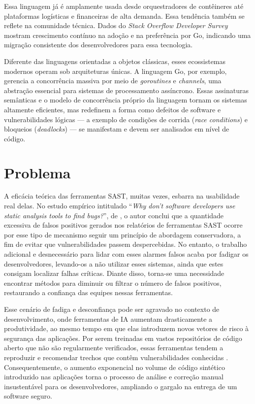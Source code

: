 Essa linguagem já é amplamente usada desde orquestradores de contêineres até plataformas logísticas e financeiras de alta demanda. Essa tendência também se reflete na comunidade técnica. Dados do \textit{Stack Overflow Developer Survey} \cite{stackoverflow2025} mostram crescimento contínuo na adoção e na preferência por Go, indicando uma migração consistente dos desenvolvedores para essa tecnologia.

Diferente das linguagens orientadas a objetos clássicas, esses ecossistemas modernos operam sob arquiteturas únicas. A linguagem Go, por exemplo, gerencia a concorrência massiva por meio de \textit{goroutines} e \textit{channels}, uma abstração essencial para sistemas de processamento assíncrono. Essas assinaturas semânticas e o modelo de concorrência próprio da linguagem tornam os sistemas altamente eficientes, mas redefinem a forma como defeitos de software e vulnerabilidades lógicas --- a exemplo de condições de corrida (\textit{race conditions}) e bloqueios (\textit{deadlocks}) --- se manifestam e devem ser analisados em nível de código.

\section{Problema}
A eficácia teórica das ferramentas SAST, muitas vezes, esbarra na usabilidade real delas. No estudo empírico intitulado ``\textit{Why don't software developers use static analysis tools to find bugs?}'', de , o autor conclui que a quantidade excessiva de falsos positivos gerados nos relatórios de ferramentas SAST ocorre por esse tipo de mecanismo seguir um princípio de abordagem conservadora, a fim de evitar que vulnerabilidades passem despercebidas. No entanto, o trabalho adicional e desnecessário para lidar com esses alarmes falsos acaba por fadigar os desenvolvedores, levando-os a não utilizar esses sistemas, ainda que estes consigam localizar falhas críticas. Diante disso, torna-se uma necessidade encontrar métodos para diminuir ou filtrar o número de falsos positivos, restaurando a confiança das equipes nessas ferramentas.

Esse cenário de fadiga e desconfiança pode ser agravado no contexto de desenvolvimento, onde ferramentas de IA aumentam drasticamente a produtividade, ao mesmo tempo em que elas introduzem novos vetores de risco à segurança das aplicações. Por serem treinadas em vastos repositórios de código aberto que não são regularmente verificados, essas ferramentas tendem a reproduzir e recomendar trechos que contêm vulnerabilidades conhecidas \cite{pearce2022copilot}. Consequentemente, o aumento exponencial no volume de código sintético introduzido nas aplicações torna o processo de análise e correção manual insustentável para os desenvolvedores, ampliando o gargalo na entrega de um software seguro.

